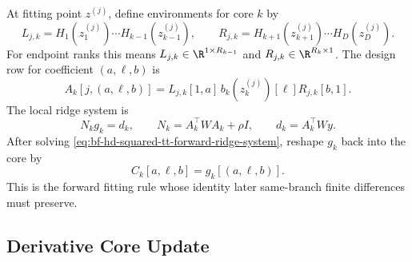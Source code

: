 At fitting point \(z^{(j)}\), define environments for core \(k\) by
\begin{equation}
  L_{j,k}=H_1(z_1^{(j)})\cdots H_{k-1}(z_{k-1}^{(j)}),
  \qquad
  R_{j,k}=H_{k+1}(z_{k+1}^{(j)})\cdots H_D(z_D^{(j)}).
  \label{eq:bf-hd-squared-tt-forward-environments}
\end{equation}
For endpoint ranks this means \(L_{j,k}\in\R^{1\times R_{k-1}}\) and
\(R_{j,k}\in\R^{R_k\times1}\).  The design row for coefficient
\((a,\ell,b)\) is
\begin{equation}
  A_k[j,(a,\ell,b)]
  =
  L_{j,k}[1,a]\,b_k(z_k^{(j)})[\ell]R_{j,k}[b,1].
  \label{eq:bf-hd-squared-tt-forward-design-row}
\end{equation}
The local ridge system is
\begin{equation}
  N_k g_k=d_k,
  \qquad
  N_k=A_k^\top W A_k+\rho I,
  \qquad
  d_k=A_k^\top Wy.
  \label{eq:bf-hd-squared-tt-forward-ridge-system}
\end{equation}
After solving \eqref{eq:bf-hd-squared-tt-forward-ridge-system}, reshape \(g_k\)
back into the core by
\begin{equation}
  C_k[a,\ell,b]=g_k[(a,\ell,b)].
  \label{eq:bf-hd-squared-tt-forward-core-reshape}
\end{equation}
This is the forward fitting rule whose identity later same-branch finite
differences must preserve.

\subsection{Derivative Core Update}
\label{sec:bf-hd-squared-tt-derivative-core-update}

